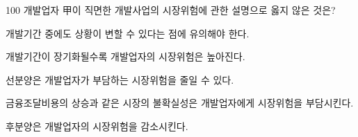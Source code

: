 \begin{question}{100}
개발업자 甲이 직면한 개발사업의 시장위험에 관한 설명으로 옳지 않은 것은?
\begin{choices}
  \item 개발기간 중에도 상황이 변할 수 있다는 점에 유의해야 한다.
  \item 개발기간이 장기화될수록 개발업자의 시장위험은 높아진다.
  \item 선분양은 개발업자가 부담하는 시장위험을 줄일 수 있다.
  \item 금융조달비용의 상승과 같은 시장의 불확실성은 개발업자에게 시장위험을 부담시킨다.
  \item 후분양은 개발업자의 시장위험을 감소시킨다.
\end{choices}
\end{question}

